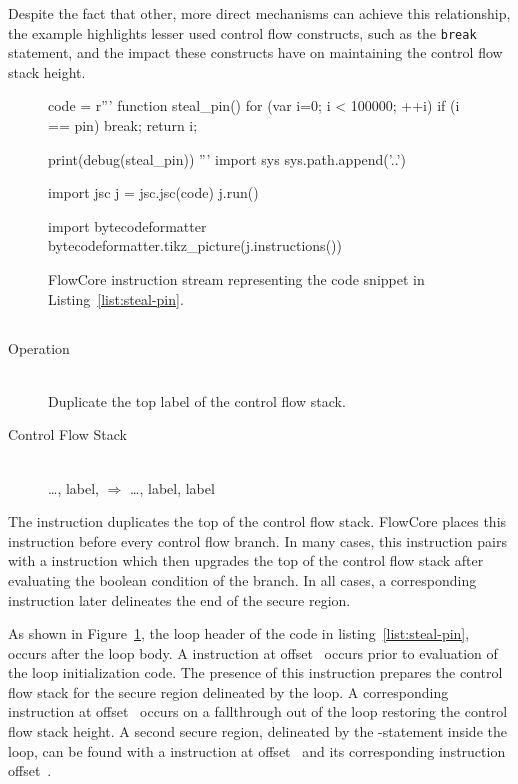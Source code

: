 Despite the fact that other, more direct mechanisms can achieve this relationship, the example highlights lesser used control flow constructs, such as the \texttt{break} statement, and the impact these constructs have on maintaining the control flow stack height.

\begin{figure}[h]
\begin{python}
code = r'''
function steal_pin() {
  for (var i=0; i < 100000; ++i) {
    if (i == pin) break;
  }
  return i;
}

print(debug(steal_pin))
'''
import sys
sys.path.append('..')

import jsc
j = jsc.jsc(code)
j.run()

import bytecodeformatter
bytecodeformatter.tikz_picture(j.instructions())
\end{python}
  \caption{FlowCore instruction stream representing the code snippet in Listing~\ref{list:steal-pin}.}
  \label{fig:steal-pin-bytecode}
\end{figure}

\subsection{\dup}

\begin{samepage}
\begin{description}
  \item[Operation] \hfill \\
    Duplicate the top label of the control flow stack.
  \item[Control Flow Stack] \hfill \\
    \ldots, label, $\Rightarrow$ \ldots, label, label
\end{description}
\end{samepage}

The \dup instruction duplicates the top of the control flow stack.
FlowCore places this instruction before every control flow branch.
In many cases, this instruction pairs with a \join instruction which then upgrades the top of the control flow stack after evaluating the boolean condition of the branch.
In all cases, a corresponding \popj instruction later delineates the end of the secure region.

As shown in Figure~\ref{fig:steal-pin-bytecode}, the loop header of the code in listing~\ref{list:steal-pin}, occurs after the loop body.
A \dup instruction at offset~ occurs prior to evaluation of the loop initialization code.
The presence of this instruction prepares the control flow stack for the secure region delineated by the loop.
A corresponding \popj instruction at offset~ occurs on a fallthrough out of the loop restoring the control flow stack height.
A second secure region, delineated by the -statement inside the loop, can be found with a \dup instruction at offset~ and its corresponding \popj instruction offset~.

